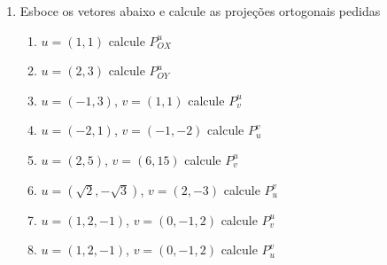 \documentclass[a4paper]{article}
\begin{document}
\begin{enumerate}
\item Esboce os vetores abaixo e calcule as projeções ortogonais pedidas
  \begin{enumerate}
  \item $u=(1,1)$ calcule $P^u_{OX}$
  \item $u=(2,3)$ calcule $P^u_{OY}$
  \item $u=(-1,3)$, $v=(1,1)$ calcule $P^u_{v}$
  \item $u=(-2,1)$, $v=(-1,-2)$ calcule $P^v_{u}$
  \item $u=(2,5)$, $v=(6,15)$ calcule $P^u_{v}$
  \item $u=(\sqrt{2},-\sqrt{3})$, $v=(2,-3)$ calcule $P^v_{u}$
  \item $u=(1,2,-1)$, $v=(0,-1,2)$ calcule $P^{u}_{v}$
  \item $u=(1,2,-1)$, $v=(0,-1,2)$ calcule $P^{v}_{u}$

  \end{enumerate}

\end{enumerate}
\end{document}
